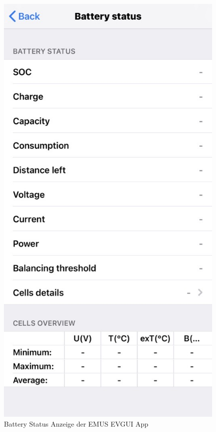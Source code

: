 \begin{figure}[H]
	\begin{center}
		\includegraphics[scale=0.5]{figures/Akku/BMSBatteryStatus.png}
		\caption{Battery Status Anzeige der EMUS EVGUI App}
	\end{center}
\end{figure}


